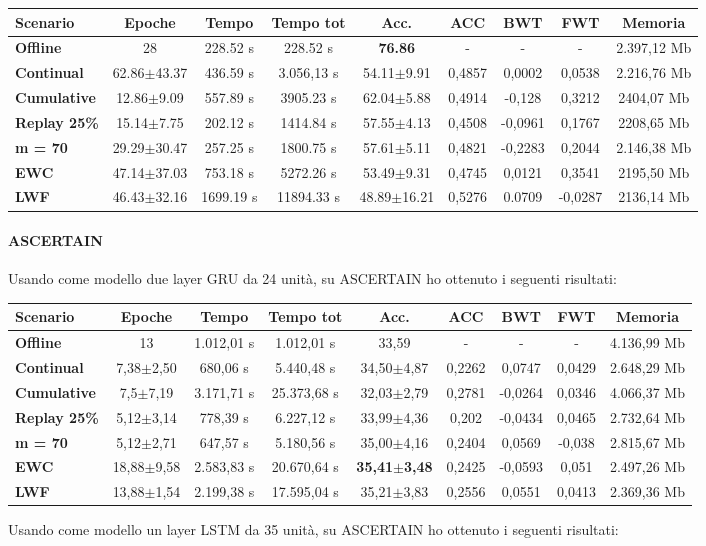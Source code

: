 \documentclass[11pt, a4paper, twoside, openright]{book}
\begin{document}
\begin{tabular}{l|c|c|c|c|c|c|c|c}
\textbf{Scenario} & \textbf{Epoche} & \textbf{Tempo} & \textbf{Tempo tot} & \textbf{Acc.} & \textbf{ACC} & \textbf{BWT} & \textbf{FWT} & \textbf{Memoria}\\
\hline
 \textbf{Offline} & 28 & 228.52 s & 228.52 s & \textbf{76.86} & - & - & - & 2.397,12 Mb\\
\textbf{Continual} & 62.86$\pm$43.37 & 436.59 s & 3.056,13 s & 54.11$\pm$9.91 & 0,4857 & 0,0002 & 0,0538 & 2.216,76 Mb\\
\textbf{Cumulative} & 12.86$\pm$9.09 & 557.89 s & 3905.23 s & 62.04$\pm$5.88 & 0,4914 & -0,128 & 0,3212 & 2404,07 Mb\\
\textbf{Replay 25\%} & 15.14$\pm$7.75 & 202.12 s & 1414.84 s & 57.55$\pm$4.13 & 0,4508 & -0,0961 & 0,1767 & 2208,65 Mb\\
\textbf{m = 70} & 29.29$\pm$30.47 & 257.25 s & 1800.75 s & 57.61$\pm$5.11 & 0,4821 & -0,2283 & 0,2044 & 2.146,38 Mb\\
\textbf{EWC} & 47.14$\pm$37.03 & 753.18 s & 5272.26 s & 53.49$\pm$9.31 & 0,4745 & 0,0121 & 0,3541 & 2195,50 Mb\\
\textbf{LWF} & 46.43$\pm$32.16 & 1699.19 s & 11894.33 s & 48.89$\pm$16.21 & 0,5276 & 0.0709 & -0,0287 & 2136,14 Mb\\
\end{tabular}
\paragraph{ASCERTAIN} Usando come modello due layer GRU da 24 unità, su ASCERTAIN ho ottenuto i seguenti risultati:

\begin{tabular}{l|c|c|c|c|c|c|c|c}
\textbf{Scenario} & \textbf{Epoche} & \textbf{Tempo} & \textbf{Tempo tot} & \textbf{Acc.} & \textbf{ACC} & \textbf{BWT} & \textbf{FWT} & \textbf{Memoria}\\
\hline
 \textbf{Offline} & 13 & 1.012,01 s & 1.012,01 s & 33,59 & - & - & - & 4.136,99 Mb\\
\textbf{Continual} & 7,38$\pm$2,50 & 680,06 s & 5.440,48 s & 34,50$\pm$4,87 & 0,2262 & 0,0747 & 0,0429 & 2.648,29 Mb\\
\textbf{Cumulative} & 7,5$\pm$7,19 & 3.171,71 s & 25.373,68 s & 	32,03$\pm$2,79 & 0,2781 & -0,0264 & 0,0346 & 4.066,37 Mb\\
\textbf{Replay 25\%} & 5,12$\pm$3,14 & 778,39 s & 6.227,12 s & 33,99$\pm$4,36 & 0,202 & -0,0434 & 0,0465 & 2.732,64 Mb\\
\textbf{m = 70} & 5,12$\pm$2,71 & 647,57 s & 5.180,56 s & 35,00$\pm$4,16 & 0,2404 & 0,0569 & -0,038 & 2.815,67 Mb\\
\textbf{EWC} & 18,88$\pm$9,58 & 2.583,83 s & 20.670,64 s & \textbf{35,41$\pm$3,48} & 0,2425 & -0,0593 & 0,051 & 2.497,26 Mb\\
\textbf{LWF} & 13,88$\pm$1,54 & 2.199,38 s & 17.595,04 s & 35,21$\pm$3,83 & 0,2556 & 0,0551 & 0,0413 & 2.369,36 Mb\\
\end{tabular}
Usando come modello un layer LSTM da 35 unità, su ASCERTAIN ho ottenuto i seguenti risultati:
\end{document}
